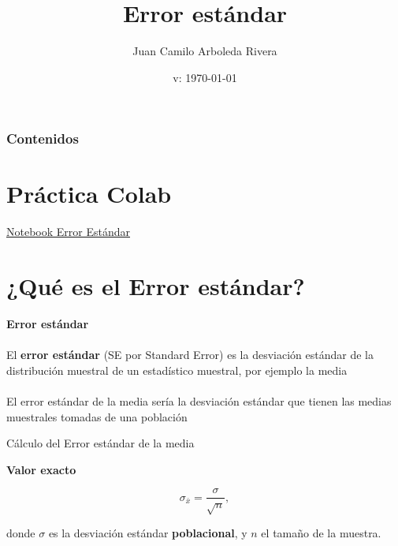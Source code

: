 \documentclass[11pt, aspectratio=169]{beamer}
\begin{document}
\author[Juan C. Arboleda Rivera]{Juan Camilo Arboleda Rivera}
\title{Error estándar}
\date{v: \today}

\begin{frame}[plain]
  \maketitle
\end{frame}

\begin{frame}
 \frametitle{Contenidos}
 \tableofcontents
\end{frame}

\section{Práctica Colab}

\begin{frame}
{}{}
 \centering \LARGE
%
\href{https://colab.research.google.com/github/Nesper94/ciencia-de-datos/blob/main/notebooks/lec13-error-estándar.ipynb}
{\color{blue} Notebook Error Estándar}
\end{frame}


\section{¿Qué es el Error estándar?}

\begin{frame}
{}{}
 \centering \Large

 \textbf{Error estándar}\\~\\

 El \textbf{error estándar} (SE por Standard Error) es la desviación
 estándar de la distribución muestral de un estadístico muestral, por
 ejemplo la media\\~\\

 El error estándar de la media sería la desviación estándar que tienen las
 medias muestrales tomadas de una población
\end{frame}

\begin{frame}
{Cálculo del Error estándar de la media}{}
 \centering \large

 \textbf{\large Valor exacto}

 $$ \sigma_{\bar{x}} = \dfrac{\sigma}{\sqrt{n}}, $$

 donde $ \sigma $ es la desviación estándar \textbf{poblacional}, y $ n $ el
 tamaño de la muestra.\\~\\

\end{frame}
\end{document}
